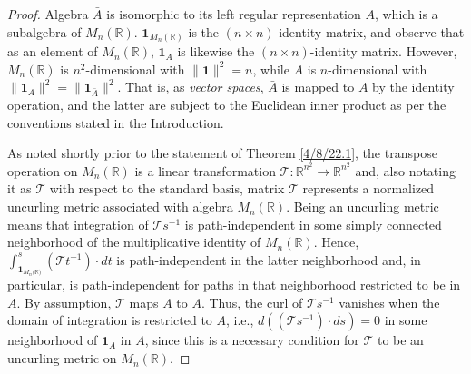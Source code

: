 \documentclass{amsart}
\numberwithin{equation}{section}
\theoremstyle{definition}
\numberwithin{theorem}{section}
\begin{document}
\begin{proof} 
Algebra $\bar{A}$ is isomorphic to its left regular representation $A$, which is a subalgebra  of $ M_n(\mathbb{R})$.   $\mathbf{1}_{M_n(\mathbb{R})}$ is the $(n\times n)$-identity matrix, and observe that as an element of $ M_n(\mathbb{R})$, $\mathbf{1}_A$ is likewise the $(n\times n)$-identity matrix.  However, $ M_n(\mathbb{R})$ is $n^2$-dimensional with $\|\mathbf{1}\|^2 = n$, while $A$ is $n$-dimensional with $\|\mathbf{1}_A\|^2 = \|\mathbf{1}_{\bar{A}}\|^2$.  That is, as {\it vector spaces}, $\bar{A}$ is mapped to  $A$ by the identity operation, and the latter are subject to the Euclidean inner product as per the conventions stated in the Introduction.   

As noted shortly prior to the statement of Theorem \ref{4/8/22.1}, the transpose operation on $ M_n(\mathbb{R})$ is a linear transformation $\mathcal{\mathcal{T}}:\mathbb{R}^{n^2}\rightarrow \mathbb{R}^{n^2}$ and, also notating it as $\mathcal{\mathcal{T}}$ with respect to the standard basis, matrix $\mathcal{\mathcal{T}}$ represents a normalized uncurling metric associated with algebra  $ M_n(\mathbb{R})$.  Being an uncurling metric means that integration of $\mathcal{\mathcal{T}}s^{-1}$ is path-independent in some simply connected neighborhood of the multiplicative identity of $ M_n(\mathbb{R})$.  
 Hence, $\int_{\mathbf{1}_{M_n({\mathbb{R})}}}^s (\mathcal{\mathcal{T}}t^{-1})\cdot dt$ is path-independent in the latter neighborhood and, in particular, is path-independent for paths in that neighborhood restricted to be in $A$.  By assumption, $\mathcal{\mathcal{T}}$ maps $A$ to $A$. 
 Thus, the curl of $\mathcal{\mathcal{T}}s^{-1}$ vanishes when the domain of integration is restricted to $A$, i.e., 
  $d((\mathcal{\mathcal{T}}s^{-1})\cdot ds) = 0$ in some neighborhood of $\mathbf{1}_A$ in $A$, since this is a necessary condition for $\mathcal{T}$ to be an uncurling metric on $ M_n(\mathbb{R})$.
  

\end{proof}
\end{document}
